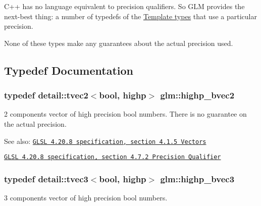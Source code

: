 C++ has no language equivalent to precision qualifiers. So GLM provides the next-best thing: a number of typedefs of the \hyperlink{group__core__template}{Template types} that use a particular precision.

None of these types make any guarantees about the actual precision used. 

\subsection{Typedef Documentation}
\hypertarget{group__core__precision_g4153415d1f3d390219ac9464652ac377}{
\subsubsection[highp\_\-bvec2]{\setlength{\rightskip}{0pt plus 5cm}typedef detail::tvec2$<$bool, highp$>$ {\bf glm::highp\_\-bvec2}}}
\label{group__core__precision_g4153415d1f3d390219ac9464652ac377}


2 components vector of high precision bool numbers. There is no guarantee on the actual precision.

\begin{Desc}
\item[See also:]\href{http://www.opengl.org/registry/doc/GLSLangSpec.4.20.8.pdf}{\tt GLSL 4.20.8 specification, section 4.1.5 Vectors} 

\href{http://www.opengl.org/registry/doc/GLSLangSpec.4.20.8.pdf}{\tt GLSL 4.20.8 specification, section 4.7.2 Precision Qualifier} \end{Desc}
\hypertarget{group__core__precision_g1d77a773fdd024602413670788c10c62}{
\subsubsection[highp\_\-bvec3]{\setlength{\rightskip}{0pt plus 5cm}typedef detail::tvec3$<$bool, highp$>$ {\bf glm::highp\_\-bvec3}}}
\label{group__core__precision_g1d77a773fdd024602413670788c10c62}


3 components vector of high precision bool numbers.

